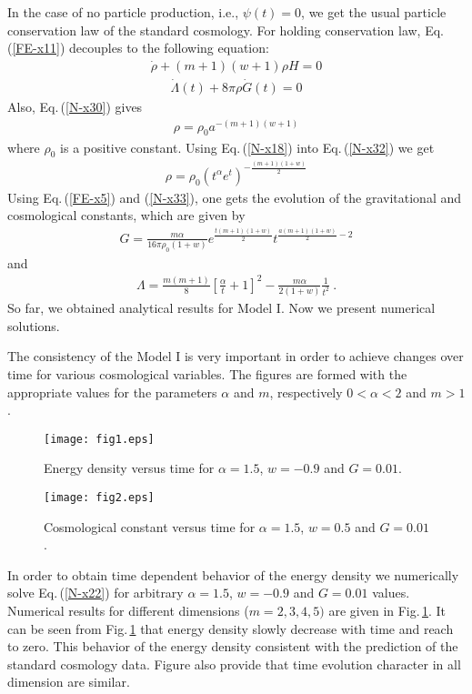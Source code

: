 \documentclass[superscriptaddress,showpacs,pre,twocolumn]{revtex4-1}
\begin{document}
In the case of no particle production, i.e., $\psi(t)=0$, we get the usual particle conservation law of the standard cosmology. For holding conservation law, Eq.\,(\ref{FE-x11}) decouples to the following equation:
\begin{eqnarray} \label{N-x30}
\dot{\rho}+(m+1)(w+1)\rho H = 0
\end{eqnarray}
\begin{eqnarray} \label{N-x31}
\dot{\Lambda}(t) + 8\pi \rho \dot{G}(t) = 0
\end{eqnarray}
Also, Eq.\,(\ref{N-x30}) gives 
\begin{eqnarray} \label{N-x32}
\rho = \rho_{0} a^{-(m+1)(w+1)}
\end{eqnarray}
where $\rho_{0}$ is a positive constant. Using Eq.\,(\ref{N-x18}) into Eq.\,(\ref{N-x32}) we get
\begin{eqnarray} \label{N-x33}
\rho = \rho_{0} (t^{\alpha} e^{t})^{-\frac{(m+1)(1+w)}{2}}
\end{eqnarray}
Using Eq.\,(\ref{FE-x5}) and (\ref{N-x33}), one gets the evolution of the gravitational and cosmological constants, which are given by
\begin{eqnarray} \label{N-x34}
G = \frac{m \alpha}{16 \pi \rho_{0}(1+w)}e^{\frac{t(m+1)(1+w)}{2}}t^{\frac{a (m+1)(1+w)}{2}-2}
\end{eqnarray}
and
\begin{eqnarray} \label{N-x35}
\Lambda = \frac{m(m+1)}{8} \left[ \frac{\alpha}{t} + 1 \right]^{2} - \frac{m \alpha}{2(1+w)} \frac{1}{t^{2}} \ .
\end{eqnarray}
So far, we obtained analytical results for Model I. Now we present numerical solutions.  

The consistency of the Model I is very important in order to achieve changes over time for various cosmological variables. The figures are formed with the appropriate values for the parameters $\alpha$ and $m$, respectively $0<\alpha<2$ and $m>1$.  
\begin{figure} [h!]
	\centering
	\texttt{[image: fig1.eps]}
	\caption{Energy density versus time for $\alpha=1.5$, $w=-0.9$ and $G=0.01$.}
	\label{fig-1}
\end{figure}
\begin{figure} [ht!]
	\centering
	\texttt{[image: fig2.eps]}
	\caption{Cosmological constant versus time for $\alpha =1.5$, $w = 0.5$ and $G = 0.01$.}
	\label{fig-2}
\end{figure}

In order to obtain time dependent behavior of the energy density we numerically solve Eq.\,(\ref{N-x22}) for arbitrary $\alpha=1.5$, $w=-0.9$ and $G=0.01$ values. Numerical results for different dimensions ($m=2,3,4,5)$ are given in Fig.\,\ref{fig-1}. It can be seen from Fig.\,\ref{fig-1} that energy density slowly decrease with time and reach to zero. This behavior of the energy density consistent with the prediction of the standard cosmology data. Figure also provide that time evolution character in all dimension are similar.  
\end{document}
